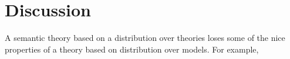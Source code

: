 \documentclass{svmult}
\begin{document}
\section{Discussion}

A semantic theory based on a distribution over theories loses some of
the nice properties of a theory based on distribution over models. For
example,




\end{document}
